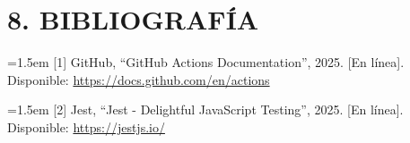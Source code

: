 \documentclass[12pt, a4paper]{article}
\begin{document}
\section*{8. BIBLIOGRAF\'IA}
\noindent\hangindent=1.5em
[1] GitHub, ``GitHub Actions Documentation'', 2025. [En l\'inea]. Disponible: \url{https://docs.github.com/en/actions}

\noindent\hangindent=1.5em
[2] Jest, ``Jest - Delightful JavaScript Testing'', 2025. [En l\'inea]. Disponible: \url{https://jestjs.io/}
\end{document}
